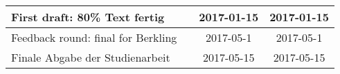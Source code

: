 \begin{tabular}{|p{6cm}|p{3.5cm}|c|c|}
First draft: 80\% Text fertig                                & \centering{Marc Mahler, Marvin Zerulla}                          & 2017-01-15          & 2017-01-15        \\ \hline
Feedback round: final for Berkling                           & \centering{Marc Mahler, Marvin Zerulla, Prof. PhD. Kay Berkling} & 2017-05-1           & 2017-05-1         \\ \hline
Finale Abgabe der Studienarbeit                              & \centering{Marc Mahler, Marvin Zerulla}                          &  2017-05-15          & 2017-05-15        \\ \hline
\end{tabular}




